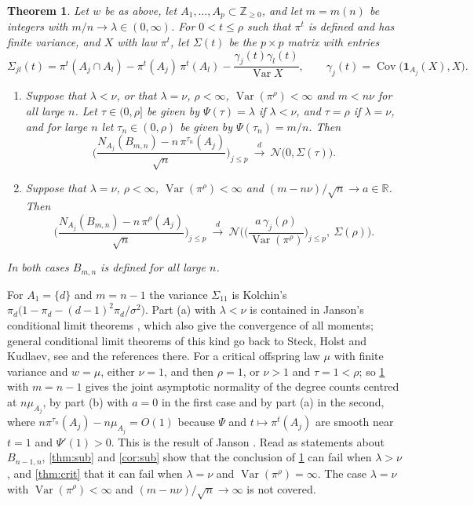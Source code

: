 \documentclass[11pt]{amsart}
\newtheorem{theorem}{Theorem}[section]
\theoremstyle{definition}
\newcommand{\R}{\mathbb{R}}
\newcommand{\Z}{\mathbb{Z}}
\newcommand{\Nor}{\mathcal{N}}
\newcommand{\Ind}{\mathbf{1}}
\DeclareMathOperator{\Var}{Var}
\DeclareMathOperator{\Cov}{Cov}
\begin{document}
\begin{theorem}\label{thm:bb}
Let $w$ be as above, let $A_1,\dots,A_p\subset\Z_{\ge0}$, and let $m=m(n)$ be integers with $m/n\to\lambda\in(0,\infty)$. For $0<t\le\rho$ such that $\pi^t$ is defined and has finite variance, and $X$ with law $\pi^t$, let $\Sigma(t)$ be the $p\times p$ matrix with entries
\[
\Sigma_{jl}(t)=\pi^t(A_j\cap A_l)-\pi^t(A_j)\,\pi^t(A_l)-\frac{\gamma_j(t)\gamma_l(t)}{\Var X},\qquad\gamma_j(t)=\Cov\big(\Ind_{A_j}(X),X\big).
\]
\begin{enumerate}
\item[(a)] Suppose that $\lambda<\nu$, or that $\lambda=\nu$, $\rho<\infty$, $\Var(\pi^\rho)<\infty$ and $m<n\nu$ for all large $n$. Let $\tau\in(0,\rho]$ be given by $\Psi(\tau)=\lambda$ if $\lambda<\nu$, and $\tau=\rho$ if $\lambda=\nu$, and for large $n$ let $\tau_n\in(0,\rho)$ be given by $\Psi(\tau_n)=m/n$. Then
\[
\Big(\frac{N_{A_j}(B_{m,n})-n\,\pi^{\tau_n}(A_j)}{\sqrt n}\Big)_{j\le p}\ \xrightarrow{d}\ \Nor\big(0,\Sigma(\tau)\big).
\]
\item[(b)] Suppose that $\lambda=\nu$, $\rho<\infty$, $\Var(\pi^\rho)<\infty$ and $(m-n\nu)/\sqrt n\to a\in\R$. Then
\[
\Big(\frac{N_{A_j}(B_{m,n})-n\,\pi^{\rho}(A_j)}{\sqrt n}\Big)_{j\le p}\ \xrightarrow{d}\ \Nor\Big(\Big(\frac{a\,\gamma_j(\rho)}{\Var(\pi^\rho)}\Big)_{j\le p},\ \Sigma(\rho)\Big).
\]
\end{enumerate}
In both cases $B_{m,n}$ is defined for all large $n$.
\end{theorem}

For $A_1=\{d\}$ and $m=n-1$ the variance $\Sigma_{11}$ is Kolchin's $\pi_d\big(1-\pi_d-(d-1)^2\pi_d/\sigma^2\big)$. Part (a) with $\lambda<\nu$ is contained in Janson's conditional limit theorems \cite[Corollaries 2.1 and 2.2]{Janson01}, which also give the convergence of all moments; general conditional limit theorems of this kind go back to Steck, Holst and Kudlaev, see \cite{Janson01} and the references there. For a critical offspring law $\mu$ with finite variance and $w=\mu$, either $\nu=1$, and then $\rho=1$, or $\nu>1$ and $\tau=1<\rho$; so \cref{thm:bb} with $m=n-1$ gives the joint asymptotic normality of the degree counts centred at $n\mu_{A_j}$, by part (b) with $a=0$ in the first case and by part (a) in the second, where $n\pi^{\tau_n}(A_j)-n\mu_{A_j}=O(1)$ because $\Psi$ and $t\mapsto\pi^t(A_j)$ are smooth near $t=1$ and $\Psi'(1)>0$. This is the result of Janson \cite[Example 2.2]{Janson16}. Read as statements about $B_{n-1,n}$, \cref{thm:sub} and \cref{cor:sub} show that the conclusion of \cref{thm:bb} can fail when $\lambda>\nu$, and \cref{thm:crit} that it can fail when $\lambda=\nu$ and $\Var(\pi^\rho)=\infty$. The case $\lambda=\nu$ with $\Var(\pi^\rho)<\infty$ and $(m-n\nu)/\sqrt n\to\infty$ is not covered.
\end{document}
